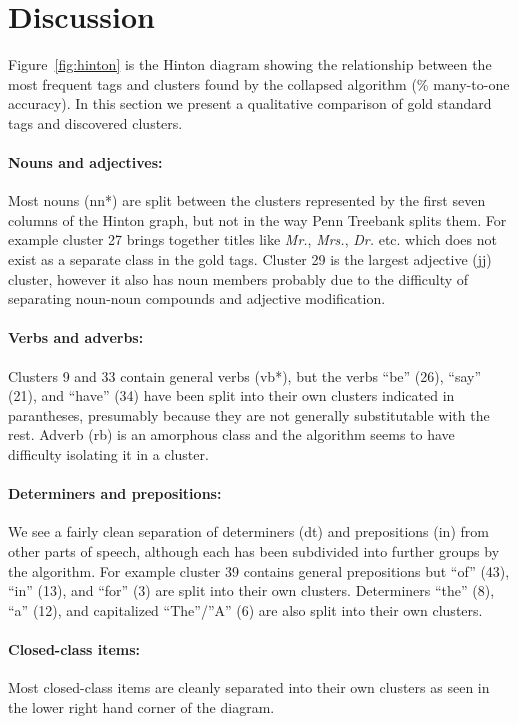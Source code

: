 \section{Discussion}
\label{sec:discussion}

Figure~\ref{fig:hinton} is the Hinton diagram showing the relationship
between the most frequent tags and clusters found by the collapsed
algorithm (\collapseResult\% many-to-one accuracy).  In this section
we present a qualitative comparison of gold standard tags and
discovered clusters.

\paragraph{Nouns and adjectives:} Most nouns ({\sc nn*}) are split between the
clusters represented by the first seven columns of the Hinton graph,
but not in the way Penn Treebank splits them.  For example cluster 27
brings together titles like {\em Mr.}, {\em Mrs.}, {\em Dr.}
etc. which does not exist as a separate class in the gold tags.
Cluster 29 is the largest adjective ({\sc jj}) cluster, however it
also has noun members probably due to the difficulty of separating
noun-noun compounds and adjective modification.

\paragraph{Verbs and adverbs:}  Clusters 9 and 33 contain general
verbs ({\sc vb*}), but the verbs ``be'' (26), ``say'' (21), and
``have'' (34) have been split into their own clusters indicated in
parantheses, presumably because they are not generally substitutable
with the rest.  Adverb ({\sc rb}) is an amorphous class and the
algorithm seems to have difficulty isolating it in a cluster.

\paragraph{Determiners and prepositions:}  We see a fairly clean
separation of determiners ({\sc dt}) and prepositions ({\sc in}) from
other parts of speech, although each has been subdivided into further
groups by the algorithm.  For example cluster 39 contains general
prepositions but ``of'' (43), ``in'' (13), and ``for'' (3) are split
into their own clusters.  Determiners ``the'' (8), ``a'' (12), and
capitalized ``The''/''A'' (6) are also split into their own clusters.

\paragraph{Closed-class items:}  Most closed-class items are cleanly
separated into their own clusters as seen in the lower right hand
corner of the diagram.
